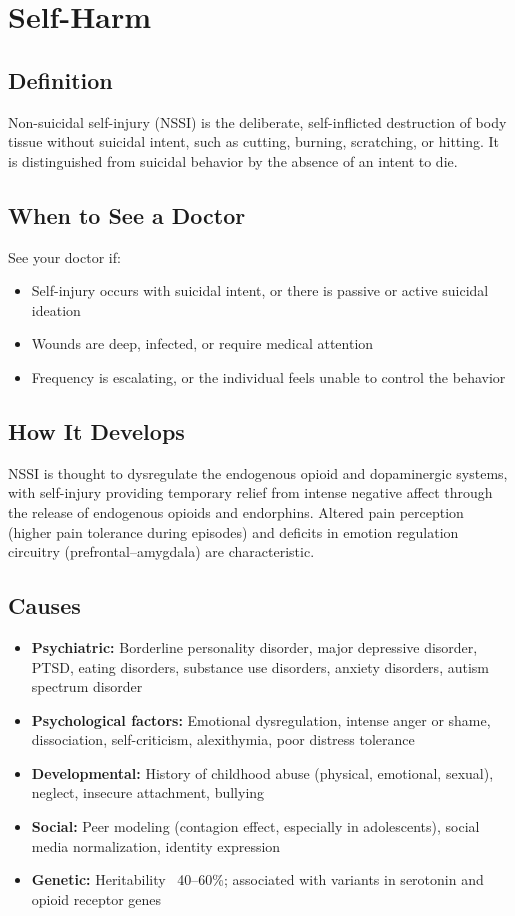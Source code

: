 \chapter{Self-Harm}

\section*{Definition}
Non-suicidal self-injury (NSSI) is the deliberate, self-inflicted destruction of body tissue without suicidal intent, such as cutting, burning, scratching, or hitting. It is distinguished from suicidal behavior by the absence of an intent to die.

\section*{When to See a Doctor}
See your doctor if:
\begin{itemize}
  \item Self-injury occurs with suicidal intent, or there is passive or active suicidal ideation
  \item Wounds are deep, infected, or require medical attention
  \item Frequency is escalating, or the individual feels unable to control the behavior
\end{itemize}

\section*{How It Develops}
NSSI is thought to dysregulate the endogenous opioid and dopaminergic systems, with self-injury providing temporary relief from intense negative affect through the release of endogenous opioids and endorphins. Altered pain perception (higher pain tolerance during episodes) and deficits in emotion regulation circuitry (prefrontal--amygdala) are characteristic.

\section*{Causes}
\begin{itemize}
  \item \textbf{Psychiatric:} Borderline personality disorder, major depressive disorder, PTSD, eating disorders, substance use disorders, anxiety disorders, autism spectrum disorder
  \item \textbf{Psychological factors:} Emotional dysregulation, intense anger or shame, dissociation, self-criticism, alexithymia, poor distress tolerance
  \item \textbf{Developmental:} History of childhood abuse (physical, emotional, sexual), neglect, insecure attachment, bullying
  \item \textbf{Social:} Peer modeling (contagion effect, especially in adolescents), social media normalization, identity expression
  \item \textbf{Genetic:} Heritability ~40--60\%; associated with variants in serotonin and opioid receptor genes
\end{itemize}

